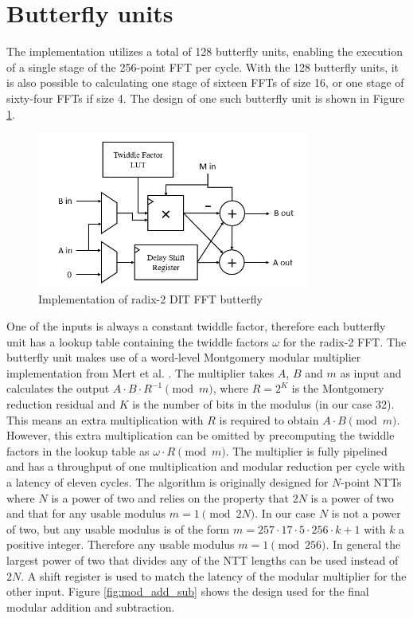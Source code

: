 \documentclass[english,master=eelt,masteroption=ec]{kulemt}
\begin{document}
\section{Butterfly units}
\label{section:butterfly_units}

The implementation utilizes a total of 128 butterfly units, enabling the execution of a single stage of the 256-point FFT per cycle. With the 128 butterfly units, it is also possible to calculating one stage of sixteen FFTs of size 16, or one stage of sixty-four FFTs if size 4. The design of one such butterfly unit is shown in Figure \ref{fig:dit_rader_butterfly}. 

\begin{figure}[h]
\centering
\includegraphics[width=0.8\textwidth]{img/dit_rader_butterfly.png}
\caption{Implementation of radix-2 DIT FFT butterfly}
\label{fig:dit_rader_butterfly}
\end{figure}

\FloatBarrier

One of the inputs is always a constant twiddle factor, therefore each butterfly unit has a lookup table containing the twiddle factors $\omega$ for the radix-2 FFT. The butterfly unit makes use of a word-level Montgomery modular multiplier implementation from Mert et al. \cite{9171507}. The multiplier takes $A$, $B$ and $m$ as input and calculates the output $A \cdot B \cdot R^{-1} \pmod m$, where $R = 2^K$ is the Montgomery reduction residual and $K$ is the number of bits in the modulus (in our case 32). This means an extra multiplication with $R$ is required to obtain $A \cdot B \pmod m$. However, this extra multiplication can be omitted by precomputing the twiddle factors in the lookup table as $\omega \cdot R \pmod m$. The multiplier is fully pipelined and has a throughput of one multiplication and modular reduction per cycle with a latency of eleven cycles. The algorithm is originally designed for $N$-point NTTs where $N$ is a power of two and relies on the property that $2N$ is a power of two and that for any usable modulus $m = 1 \pmod{2N}$. In our case $N$ is not a power of two, but any usable modulus is of the form $m = 257 \cdot 17 \cdot 5 \cdot 256 \cdot k + 1$ with $k$ a positive integer. Therefore any usable modulus $m = 1 \pmod{256}$. In general the largest power of two that divides any of the NTT lengths can be used instead of $2N$. A shift register is used to match the latency of the modular multiplier for the other input. Figure \ref{fig:mod_add_sub} shows the design used for the final modular addition and subtraction.
\end{document}
